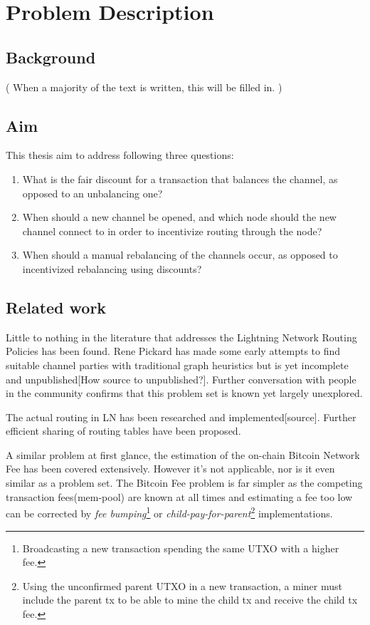 \chapter{Problem Description}

\section{Background}
    \label{sec:background}

	( When a majority of the text is written, this will be filled in. )

\section{Aim}
    \label{sec:aim}

This thesis aim to address following three questions:

    \begin{enumerate}
	\item What is the fair discount for a transaction that balances the channel, as
		opposed to an unbalancing one?
	\item When should a new channel be opened, and which node should the new
		channel connect to in order to incentivize routing through the node?
	\item When should a manual rebalancing of the channels occur, as opposed to
		incentivized rebalancing using discounts?
    \end{enumerate}

\section{Related work}
    \label{sec:related_work}

	Little to nothing in the literature that addresses the Lightning Network Routing Policies has been found. Rene Pickard has made some early attempts to find suitable channel parties with traditional graph heuristics but is yet incomplete and unpublished[How source to unpublished?]. Further conversation with people in the community confirms that this problem set is known yet largely unexplored.
	
	The actual routing in LN has been researched\cite{distasi:avallone:cononico:routing} and implemented[source]. Further efficient sharing of routing tables have been proposed\cite{gunspan:marco:ant}.
	
	A similar problem at first glance, the estimation of the on-chain Bitcoin Network Fee has been covered extensively. However it's not applicable, nor is it even similar as a problem set. The Bitcoin Fee problem is far simpler as the competing transaction fees(mem-pool) are known at all times and estimating a fee too low can be corrected by \textit{fee bumping}\footnote{Broadcasting a new transaction spending the same UTXO with a higher fee.} or \textit{child-pay-for-parent}\footnote{Using the unconfirmed parent UTXO in a new transaction, a miner must include the parent tx to be able to mine the child tx and receive the child tx fee.} implementations.
	
